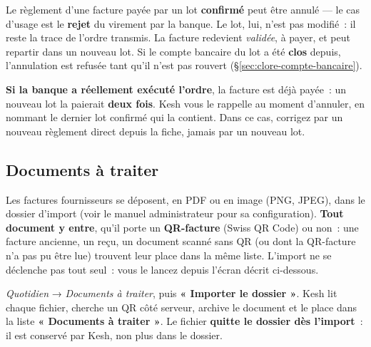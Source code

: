 \documentclass[a4paper,11pt,oneside]{article}
\begin{document}
\begin{keshwarning}[title=\faExclamationTriangle\ Annuler le règlement d'une facture payée par lot]
Le règlement d'une facture payée par un lot \textbf{confirmé} peut être annulé --- le cas
d'usage est le \textbf{rejet} du virement par la banque. Le lot, lui, n'est pas modifié~: il
reste la trace de l'ordre transmis. La facture redevient \emph{validée}, à payer, et peut repartir dans un
nouveau lot. Si le compte bancaire du lot a été \textbf{clos} depuis, l'annulation est refusée
tant qu'il n'est pas rouvert (\S\ref{sec:clore-compte-bancaire}).

\textbf{Si la banque a réellement exécuté l'ordre}, la facture est déjà payée~: un nouveau lot
la paierait \textbf{deux fois}. Kesh vous le rappelle au moment d'annuler, en nommant le dernier
lot confirmé qui la contient. Dans ce cas, corrigez par un nouveau règlement direct depuis la
fiche, jamais par un nouveau lot.
\end{keshwarning}

\subsection{Documents à traiter}
\label{sec:import-factures}

Les factures fournisseurs se déposent, en PDF ou en image (PNG, JPEG), dans le dossier
d'import (voir le manuel administrateur pour sa configuration). \textbf{Tout document y
entre}, qu'il porte un \textbf{QR-facture} (Swiss QR Code) ou non~: une facture ancienne,
un reçu, un document scanné sans QR (ou dont la QR-facture n'a pas pu être lue) trouvent
leur place dans la même liste.
L'import ne se déclenche pas tout seul~: vous le lancez depuis l'écran décrit ci-dessous.

\emph{Quotidien} → \emph{Documents à traiter}, puis \textbf{« Importer le dossier »}.
Kesh lit chaque fichier, cherche un QR côté serveur, archive le document et le place dans
la liste \textbf{« Documents à traiter »}. Le fichier \textbf{quitte le dossier dès
l'import}~: il est conservé par Kesh, non plus dans le dossier.
\end{document}
